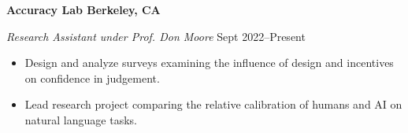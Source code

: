 \textbf{Accuracy Lab \hfill Berkeley, CA}\par

\textit{Research Assistant under Prof. Don Moore} \hfill Sept 2022--Present\par
\begin{itemize}
	\item Design and analyze surveys examining the influence of design and incentives on confidence in judgement.
	\item Lead research project comparing the relative calibration of humans and AI on natural language tasks.
\end{itemize}\par